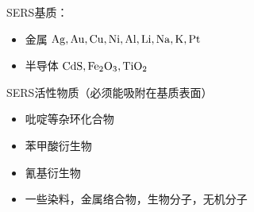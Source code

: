 SERS基质： 
\begin{itemize}
    \item     金属    $\ce{Ag},\ce{ Au}, \ce{Cu},\ce{Ni},\ce{ Al},\ce{ Li},\ce{ Na,} \ce{K}, \ce{Pt}
    $
    \item     半导体  $\ce{CdS}, \ce{Fe_{2}O_{3}}, \ce{TiO_{2}}$
\end{itemize}


SERS活性物质（必须能吸附在基质表面）
\begin{itemize}
    \item 	吡啶等杂环化合物
    \item   苯甲酸衍生物
    \item   氰基衍生物
    \item   一些染料，金属络合物，生物分子，无机分子
\end{itemize}
